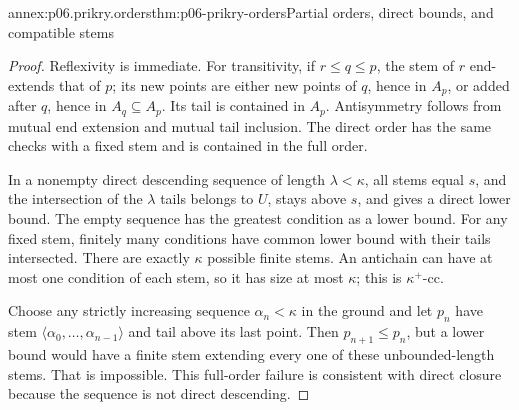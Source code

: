 \begin{annexitem}{annex:p06.prikry.orders}{thm:p06-prikry-orders}{Partial orders, direct bounds, and compatible stems}
\begin{proof}
Reflexivity is immediate. For transitivity, if \(r\leq q\leq p\),
the stem of \(r\) end-extends that of \(p\); its new points are either
new points of \(q\), hence in \(A_p\), or added after \(q\), hence
in \(A_q\subseteq A_p\). Its tail is contained in \(A_p\).
Antisymmetry follows from mutual end extension and mutual tail inclusion.
The direct order has the same checks with a fixed stem and is contained
in the full order.

In a nonempty direct descending sequence of length \(\lambda<\kappa\),
all stems equal \(s\), and the intersection of the \(\lambda\) tails
belongs to \(U\), stays above \(s\), and gives a direct lower bound.
The empty sequence has the greatest condition as a lower bound.
For any fixed stem, finitely many conditions have common lower bound
with their tails intersected. There are exactly \(\kappa\) possible
finite stems. An antichain can have at most one condition of each stem,
so it has size at most \(\kappa\); this is \(\kappa^+\)-cc.

Choose any strictly increasing sequence \(\alpha_n<\kappa\) in the
ground and let \(p_n\) have stem
\(\langle\alpha_0,\ldots,\alpha_{n-1}\rangle\) and tail above its
last point. Then \(p_{n+1}\leq p_n\), but a lower bound would have
a finite stem extending every one of these unbounded-length stems.
That is impossible. This full-order failure is consistent with direct
closure because the sequence is not direct descending.
\end{proof}
\end{annexitem}

